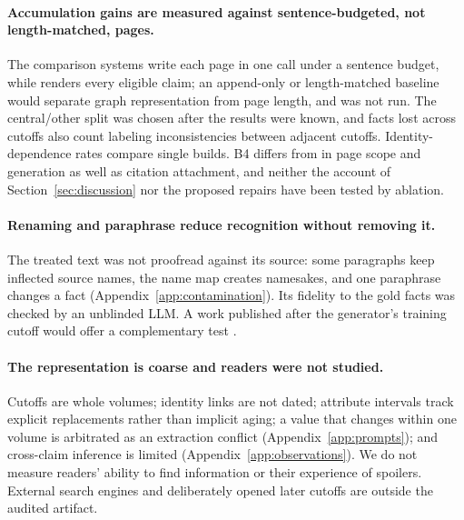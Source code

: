 \paragraph{Accumulation gains are measured against sentence-budgeted, not length-matched, pages.}
The comparison systems write each page in one call under a sentence budget, while \sys
renders every eligible claim; an append-only or length-matched baseline would separate graph
representation from page length, and was not run. The central/other split was chosen after
the results were known, and facts lost across cutoffs also count labeling inconsistencies
between adjacent cutoffs. Identity-dependence rates compare single builds. B4 differs from
\sys in page scope and generation as well as citation attachment, and neither the account of
Section~\ref{sec:discussion} nor the proposed repairs have been tested by ablation.

\paragraph{Renaming and paraphrase reduce recognition without removing it.}
The treated text was not proofread against its source: some paragraphs keep inflected
source names, the name map creates namesakes, and one paraphrase changes a fact
(Appendix~\ref{app:contamination}). Its fidelity to the gold facts was checked by an
unblinded LLM. A work published after the generator's training cutoff would offer a
complementary test \citep{karpinska2024nocha}.

\paragraph{The representation is coarse and readers were not studied.}
Cutoffs are whole volumes; identity links are not dated; attribute intervals track explicit
replacements rather than implicit aging; a value that changes within one volume is
arbitrated as an extraction conflict (Appendix~\ref{app:prompts}); and cross-claim inference
is limited (Appendix~\ref{app:observations}). We do not measure readers' ability to find
information or their experience of spoilers. External search engines and deliberately opened
later cutoffs are outside the audited artifact.
